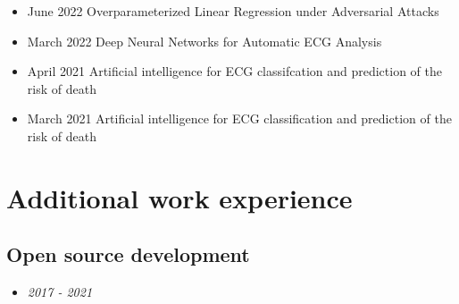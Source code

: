 \documentclass[10pt,A4]{article} %
\begin{document}
\begin{itemize}
      
    
        \item {}
    { June 2022 }
    { Overparameterized Linear Regression under Adversarial Attacks  }
    { }{}
    
      
    
        \item {}
    { March 2022 }
    { Deep Neural Networks for Automatic ECG Analysis  }
    { }{}
    
      
    
        \item {}
    { April 2021 }
    { Artificial intelligence for ECG classifcation and prediction of the risk of death  }
    { }{}
    
      
    
        \item {}
    { March 2021 }
    { Artificial intelligence for ECG classification and prediction of the risk of death  }
    { }{}
    
      
\end{itemize}        





\section{Additional work experience} %

\subsection{Open source development}

\begin{itemize}
\item {}
  {}
  {\em 2017 - 2021}{}
  {}
\end{itemize}
\end{document}
